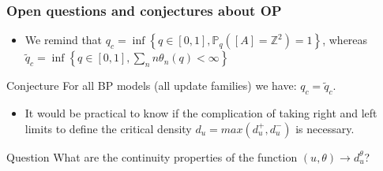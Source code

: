 \begin{frame}
	\frametitle {Open questions and conjectures about OP}
	\begin{itemize}
		\item We remind that $q_{c}=\inf \left\{q \in[0,1], \mathbb{P}_{q}\left([A]=\mathbb{Z}^{2}\right)=1\right\}$, whereas $\tilde{q}_{c}=\inf \left\{q \in[0,1], \sum_{n} n \theta_{n}(q)<\infty\right\}$
	\end{itemize}
	\begin{block}{Conjecture}
		For all BP models (all update families) we have: $q_{c} = \tilde{q}_{c}$.
	\end{block}
	\begin{itemize}
		\item It would be practical to know if the complication of taking right and left limits to define the critical density $d_{u} = max(d_{u}^{+}, d_{u}^{-})$ is necessary.
	\end{itemize}
	\begin{block}{Question}
		What are the continuity properties of the function $(u, \theta) \rightarrow d_{u}^{\theta}$?
	\end{block}
\end{frame}





